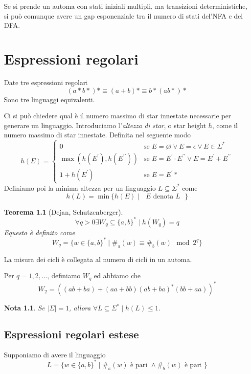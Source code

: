 \documentclass[12pt]{report}
\newtheorem{teorema}{Teorema}
\newtheorem{nota}{Nota}
\begin{document}
Se si prende un automa con stati iniziali multipli, ma transizioni deterministiche, si può comunque avere un gap esponenziale tra il numero di stati del'NFA e del DFA.

\chapter{Espressioni regolari}
Date tre espressioni regolari
$$ (a*b*)* \equiv (a + b)* \equiv b*(ab*)* $$
Sono tre linguaggi equivalenti.

Ci si può chiedere qual è il numero massimo di star innestate necessarie per generare un linguaggio.
Introduciamo l'\textit{altezza di star}, o star height $h$, come il numero massimo di star innestate.
Definita nel seguente modo
$$ h(E) = 
\begin{cases}
	0 & \text{se } E = \varnothing \vee E = \epsilon \vee E \in \Sigma^* \\
	\max(h(E^\prime), h(E^{\prime\prime})) & \text{se } E = E^\prime \cdot E^{\prime\prime} \vee E = E^\prime + E^{\prime\prime} \\
	1 + h(E^\prime) & \text{se } E = E^\prime*
\end{cases}
$$
Definiamo poi la minima altezza per un linguaggio $L \subseteq \Sigma^*$ come
$$ h(L) = \min \{ h(E) \mid \text{ $E$ denota $L$ } \} $$

\begin{teorema}[Dejan, Schutzenberger]
	$$\forall q > 0 \exists W_q \subseteq \{a, b\}^* \mid h(W_q) = q $$
	Equesto è definito come
	$$ W_q = \{ w \in \{a, b\}^* \mid \#_a(w) \equiv \#_b(w) \mod 2^q \} $$
\end{teorema}

La misura dei cicli è collegata al numero di cicli in un automa.
\begin{tcolorbox}
	Per $q = 1, 2, \dots$, definiamo $W_q$ ed abbiamo che
	$$ W_2 = ((ab + ba) + (aa + bb)(ab + ba)^*(bb + aa))^* $$
\end{tcolorbox}

\begin{nota}
	Se $|\Sigma| = 1$, allora $\forall L \subseteq \Sigma^* \mid h(L) \leq 1$.
\end{nota}

\section{Espressioni regolari estese}
Supponiamo di avere il linguaggio
$$ L = \{ w \in \{a, b\}^* \mid \#_a(w) \text{ è pari } \wedge \#_b(w) \text{ è pari } \} $$
\end{document}
